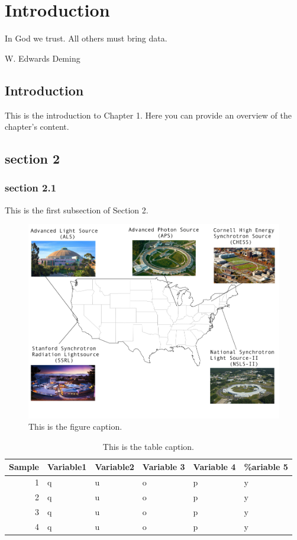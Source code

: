 \documentclass[11pt]{article}
\author{Blaine Mooers}
\date{\today}
\title{}
\begin{document}
\tableofcontents

\chapter{Introduction}
\epigraph{In God we trust. All others must bring data.}{W. Edwards Deming}

\section{Introduction}
This is the introduction to Chapter 1.
Here you can provide an overview of the chapter's content.

\section{section 2}
\subsection{section 2.1}
This is the first subsection of Section 2.


\begin{figure}
    \centering
    \includegraphics[scale=0.68]{./Contents/figs/LightSourcesUSA.png}
    \caption{This is the figure caption. \label{fig:LightSources}}
\end{figure}

\begin{table}[htbp]
\caption{This is the table caption.}
\centering
\begin{tabular}{rlllll}
Sample & Variable1 & Variable2 & Variable 3 & Variable 4 & \%ariable 5\\[0pt]
\hline
1 & q & u & o & p & y\\[0pt]
2 & q & u & o & p & y\\[0pt]
3 & q & u & o & p & y\\[0pt]
4 & q & u & o & p & y\\[0pt]
\end{tabular}
\end{table}
\end{document}
